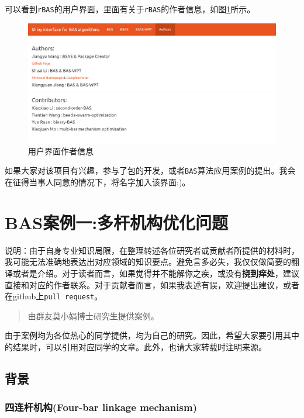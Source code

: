 \documentclass[]{ctexbook}
\theoremstyle{definition}
\theoremstyle{definition}
\theoremstyle{definition}
\theoremstyle{remark}
\begin{document}
可以看到\texttt{rBAS}的用户界面，里面有关于\texttt{rBAS}的作者信息，如图\ref{fig:author}所示。

\begin{figure}

{\centering \includegraphics[width=1\linewidth]{img/author} 

}

\caption{用户界面作者信息}\label{fig:author}
\end{figure}

如果大家对该项目有兴趣，参与了包的开发，或者\texttt{BAS}算法应用案例的提出。我会在征得当事人同意的情况下，将名字加入该界面:)。

\chapter{BAS案例一:多杆机构优化问题}\label{examples}

说明：由于自身专业知识局限，在整理转述各位研究者或贡献者所提供的材料时，我可能无法准确地表达出对应领域的知识要点。避免言多必失，我仅仅做简要的翻译或者是介绍。对于读者而言，如果觉得并不能解你之疾，或没有\textbf{挠到痒处}，建议直接和对应的作者联系。对于贡献者而言，如果我表述有误，欢迎提出建议，或者在github上\texttt{pull\ request}。

\begin{quote}
由群友莫小娟博士研究生提供案例。
\end{quote}

由于案例均为各位热心的同学提供，均为自己的研究。因此，希望大家要引用其中的结果时，可以引用对应同学的文章。此外，也请大家转载时注明来源。

\section{背景}

\subsection{四连杆机构(Four-bar linkage mechanism)}\label{bars4}
\end{document}
